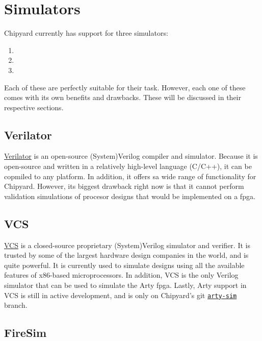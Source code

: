 \chapter{Simulators}\label{chap:Simulators}
Chipyard currently has support for three simulators:
\begin{enumerate}
\item {}
\item {}
\item {}
\end{enumerate}

Each of these are perfectly suitable for their task.
However, each one of these comes with its own benefits and drawbacks.
These will be discussed in their respective sections.

\section{Verilator}\label{sec:Verilator_Simulator}
\href{https://www.veripool.org/wiki/verilator}{Verilator} is an open-source (System)Verilog compiler and simulator.
Because it is open-source and written in a relatively high-level language (C/C++), it can be copmiled to any platform.
In addition, it offers sa wide range of functionality for Chipyard.
However, its biggest drawback right now is that it cannot perform validation simulations of procesor designs that would be implemented on a \gls{fpga}.

\section{VCS}\label{sec:VCS_Simulator}
\href{https://www.synopsys.com/verification/simulation/vcs.html}{VCS} is a closed-source proprietary (System)Verilog simulator and verifier.
It is trusted by some of the largest hardware design companies in the world, and is quite powerful.
It is currently used to simulate designs using all the available features of x86-based microprocessors.
In addition, VCS is the only Verilog simulator that can be used to simulate the Arty \Gls{fpga}.
Lastly, Arty support in VCS is still in active development, and is only on Chipyard's git \href{https://github.com/ucb-bar/chipyard/tree/arty-sim}{\texttt{arty-sim}} branch.

\section{FireSim}\label{sec:FireSim_Simulator}
\nocite{firesimPresentation}

